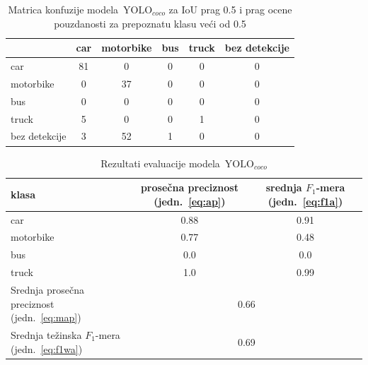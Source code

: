 \documentclass[12pt,oneside]{memoir}
\newcommand{\yolo}{\ensuremath{\,\textrm{YOLO}}}
\begin{document}
\begin{table}
    \begin{center}
    \caption{Matrica konfuzije modela $\yolo_{coco}$ za IoU prag 0.5 i prag ocene pouzdanosti za prepoznatu klasu veći od 0.5 }
    \begin{tabular}{ l|c|c|c|c|c|}
                  & car  & motorbike & bus & truck & bez detekcije \\ \hline
    car           & 81   & 0         & 0   & 0     & 0             \\ 
    motorbike     & 0    & 37        & 0   & 0     & 0             \\ 
    bus           & 0    & 0         & 0   & 0     & 0             \\ 
    truck         & 5    & 0         & 0   & 1     & 0             \\ 
    bez detekcije & 3    & 52        & 1   & 0     & 0             \\ \hline
    \hline
    \end{tabular}
    \label{tab:YOLO4_COCO_confusion_mat}
    \end{center}
\end{table}


\begin{table}
    \begin{center}
    \caption{Rezultati evaluacije modela $\yolo_{coco}$}
        \begin{tabular}{|m{10em}|c|c|}
        \toprule
        klasa     & prosečna preciznost (jedn.~\ref{eq:ap}) & srednja $F_1$-mera (jedn.~\ref{eq:f1a})  \\ \hline
        \midrule
        car       & 0.88  & 0.91 \\ \hline
        motorbike & 0.77  & 0.48 \\ \hline
        bus       & 0.0   & 0.0  \\ \hline
        truck     & 1.0   & 0.99 \\ \hline
        \bottomrule
        Srednja prosečna preciznost (jedn.~\ref{eq:map}) & \multicolumn{2}{c|}{0.66}  \\ \hline
        Srednja težinska $F_1$-mera (jedn.~\ref{eq:f1wa}) & \multicolumn{2}{c|}{0.69}  \\ \hline
    \end{tabular}
    \label{tab:YOLO4_COCO_results}
    \end{center}
\end{table}
\end{document}
